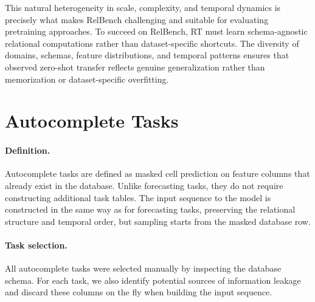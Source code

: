 This natural heterogeneity in scale, complexity, and temporal dynamics is precisely what makes RelBench challenging and suitable for evaluating pretraining approaches. To succeed on RelBench, RT must learn schema-agnostic relational computations rather than dataset-specific shortcuts. The diversity of domains, schemas, feature distributions, and temporal patterns ensures that observed zero-shot transfer reflects genuine generalization rather than memorization or dataset-specific overfitting.


\section{Autocomplete Tasks}
\label{app:autocomplete_tasks}

\paragraph{Definition.}
Autocomplete tasks are defined as masked cell prediction on feature columns that already exist in the database. Unlike forecasting tasks, they do not require constructing additional task tables. The input sequence to the model is constructed in the same way as for forecasting tasks, preserving the relational structure and temporal order, but sampling starts from the masked database row.

\paragraph{Task selection.}
All autocomplete tasks were selected manually by inspecting the database schema. For each task, we also identify potential sources of information leakage and discard these columns on the fly when building the input sequence.

